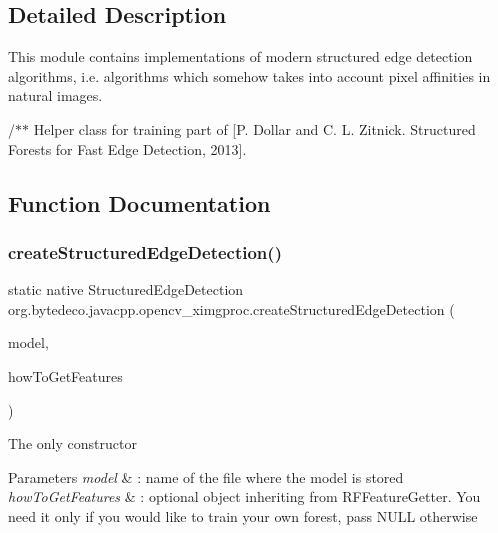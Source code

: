 \subsection{Detailed Description}
This module contains implementations of modern structured edge detection algorithms, i.\+e. algorithms which somehow takes into account pixel affinities in natural images. 

/$\ast$$\ast$ Helper class for training part of \mbox{[}P. Dollar and C. L. Zitnick. Structured Forests for Fast Edge Detection, 2013\mbox{]}. 

\subsection{Function Documentation}
\mbox{\label{group__ximgproc__edge_gafcb7c834ebdb82e5b362789a94b9e034}} 
\subsubsection{\texorpdfstring{create\+Structured\+Edge\+Detection()}{createStructuredEdgeDetection()}}
{\footnotesize\ttfamily static native Structured\+Edge\+Detection org.\+bytedeco.\+javacpp.\+opencv\+\_\+ximgproc.\+create\+Structured\+Edge\+Detection (\begin{DoxyParamCaption}\item[{@Str Byte\+Pointer}]{model,  }\item[{@Const @Ptr R\+F\+Feature\+Getter}]{how\+To\+Get\+Features }\end{DoxyParamCaption})\hspace{0.3cm}{\ttfamily [static]}}

The only constructor


\begin{DoxyParams}{Parameters}
{\em model} & \+: name of the file where the model is stored \\
\hline
{\em how\+To\+Get\+Features} & \+: optional object inheriting from R\+F\+Feature\+Getter. You need it only if you would like to train your own forest, pass N\+U\+LL otherwise \\
\hline
\end{DoxyParams}
